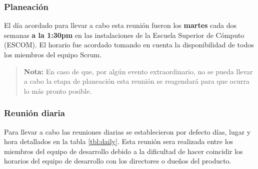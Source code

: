 \clearpage

\subsubsection{Planeación}

 \noindent El día acordado para llevar a cabo esta reunión fueron los {\bf martes} cada dos semanas
 {\bf a la 1:30pm} en las instalaciones de la Escuela Superior de Cómputo (ESCOM). El horario fue
 acordado tomando en cuenta la disponibilidad de todos los miembros del equipo Scrum.

    \begin{quote}
    {\bf Nota:} En caso de que, por algún evento extraordinario, no se pueda
                llevar a cabo la etapa de planeación esta reunión se reagendará
                para que ocurra lo más pronto posible.
    \end{quote}

\subsubsection{Reunión diaria}

 \noindent
 Para llevar a cabo las reuniones diarias se establecieron por defecto días, lugar y
 hora detallados en la tabla \ref{tbl:daily}. Esta reunión sera realizada entre los
 miembros del equipo de desarrollo debido a la dificultad de hacer coincidir los
 horarios del equipo de desarrollo con los directores o dueños del producto.

